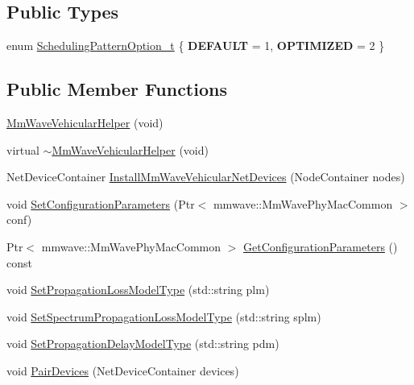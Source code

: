 \subsection*{Public Types}
\begin{DoxyCompactItemize}
\item 
enum \hyperlink{classns3_1_1millicar_1_1MmWaveVehicularHelper_a7b56a1dec16b395a2b07f3e2267bc8e8}{Scheduling\+Pattern\+Option\+\_\+t} \{ {\bfseries D\+E\+F\+A\+U\+LT} = 1, 
{\bfseries O\+P\+T\+I\+M\+I\+Z\+ED} = 2
 \}
\end{DoxyCompactItemize}
\subsection*{Public Member Functions}
\begin{DoxyCompactItemize}
\item 
\hyperlink{classns3_1_1millicar_1_1MmWaveVehicularHelper_aba839ec88d07cfaf576bb7c69cbdfa43}{Mm\+Wave\+Vehicular\+Helper} (void)
\item 
virtual \hyperlink{classns3_1_1millicar_1_1MmWaveVehicularHelper_ae49877d6086c33c972893422dd242bd4}{$\sim$\+Mm\+Wave\+Vehicular\+Helper} (void)
\item 
Net\+Device\+Container \hyperlink{classns3_1_1millicar_1_1MmWaveVehicularHelper_adb23c9d4f13972fd3bac3b35a23582c4}{Install\+Mm\+Wave\+Vehicular\+Net\+Devices} (Node\+Container nodes)
\item 
void \hyperlink{classns3_1_1millicar_1_1MmWaveVehicularHelper_a0976a2d0e5f3bce4bc7fb75f67209d8f}{Set\+Configuration\+Parameters} (Ptr$<$ mmwave\+::\+Mm\+Wave\+Phy\+Mac\+Common $>$ conf)
\item 
Ptr$<$ mmwave\+::\+Mm\+Wave\+Phy\+Mac\+Common $>$ \hyperlink{classns3_1_1millicar_1_1MmWaveVehicularHelper_aa1ab3205ac126fabac48608c0bbf8dcd}{Get\+Configuration\+Parameters} () const
\item 
void \hyperlink{classns3_1_1millicar_1_1MmWaveVehicularHelper_a0bd9a7da6f128d5cf4411e8757d9c884}{Set\+Propagation\+Loss\+Model\+Type} (std\+::string plm)
\item 
void \hyperlink{classns3_1_1millicar_1_1MmWaveVehicularHelper_ae03289dc88f603994c8ec5649756878f}{Set\+Spectrum\+Propagation\+Loss\+Model\+Type} (std\+::string splm)
\item 
void \hyperlink{classns3_1_1millicar_1_1MmWaveVehicularHelper_a065bd56895c9de5e3df2e8e733a29f3b}{Set\+Propagation\+Delay\+Model\+Type} (std\+::string pdm)
\item 
void \hyperlink{classns3_1_1millicar_1_1MmWaveVehicularHelper_ad534c932d9a9ff86e41fa6f09377001f}{Pair\+Devices} (Net\+Device\+Container devices)

\end{DoxyCompactItemize}
